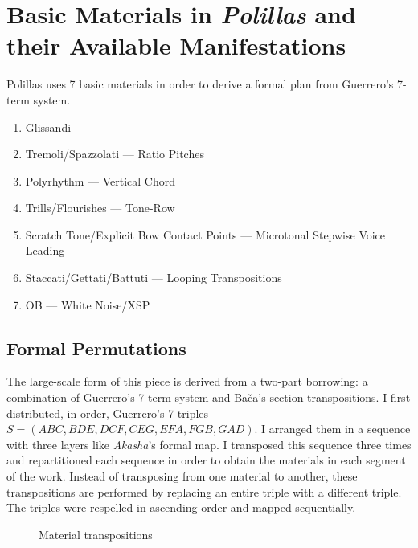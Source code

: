 \section{Basic Materials in \textit{Polillas} and their Available Manifestations}

Polillas uses 7 basic materials in order to derive a formal plan from Guerrero's 7-term system.

\begin{enumerate}[label=\Alph*]
\item Glissandi
\item Tremoli/Spazzolati — Ratio Pitches
\item Polyrhythm — Vertical Chord
\item Trills/Flourishes — Tone-Row
\item Scratch Tone/Explicit Bow Contact Points — Microtonal Stepwise Voice Leading
\item Staccati/Gettati/Battuti — Looping Transpositions
\item \ac{OB} — White Noise/\ac{XSP}
\end{enumerate}

\subsection{Formal Permutations}

The large-scale form of this piece is derived from a two-part borrowing: a combination of Guerrero's 7-term system and Bača's section transpositions. I first distributed, in order, Guerrero's 7 triples $S = (ABC, BDE, DCF, CEG, EFA, FGB, GAD)$. I arranged them in a sequence with three layers like \textit{Akasha}'s formal map. I transposed this sequence three times and repartitioned each sequence in order to obtain the materials in each segment of the work. Instead of transposing from one material to another, these transpositions are performed by replacing an entire triple with a different triple. The triples were respelled in ascending order and mapped sequentially.

\begin{figure}[H]
    \centering
{}
    \caption{Material transpositions}
    \label{fig:polillas-material-transposition}
\end{figure}

